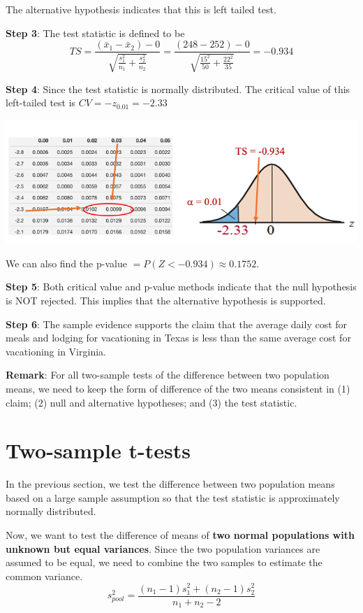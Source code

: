 \documentclass[
]{book}
\begin{document}
The alternative hypothesis indicates that this is left tailed test.

\textbf{Step 3}: The test statistic is defined to be
\[
TS = \frac{(\bar{x}_1 - \bar{x}_2) -0}{\sqrt{\frac{s_1^2}{n_1} + \frac{s_2^2}{n_2}}} = \frac{(248 - 252) -0}{\sqrt{\frac{15^2}{50} + \frac{22^2}{35}}}= -0.934
\]

\textbf{Step 4}: Since the test statistic is normally distributed. The critical value of this left-tailed test is \(CV = -z_{0.01} = -2.33\)

\includegraphics[width=0.7\linewidth]{week11/example01}

We can also find the p-value \(=P(Z < -0.934) \approx 0.1752.\)

\textbf{Step 5}: Both critical value and p-value methods indicate that the null hypothesis is NOT rejected. This implies that the alternative hypothesis is supported.

\textbf{Step 6}: The sample evidence supports the claim that the average daily cost for meals and lodging for vacationing in Texas is less than the same average cost for vacationing in Virginia.

\hfill\break
\textbf{Remark}: For all two-sample tests of the difference between two population means, we need to keep the form of difference of the two means consistent in (1) claim; (2) null and alternative hypotheses; and (3) the test statistic.

\hfill\break

\hypertarget{two-sample-t-tests}{%
\section{Two-sample t-tests}\label{two-sample-t-tests}}

In the previous section, we test the difference between two population means based on a large sample assumption so that the test statistic is approximately normally distributed.

Now, we want to test the difference of means of \textbf{two normal populations with unknown but equal variances}. Since the two population variances are assumed to be equal, we need to combine the two samples to estimate the common variance.
\[
s_{pool}^2 = \frac{(n_1-1)s_1^2 + (n_2-1)s_2^2}{n_1 + n_2 -2}
\]
\end{document}
